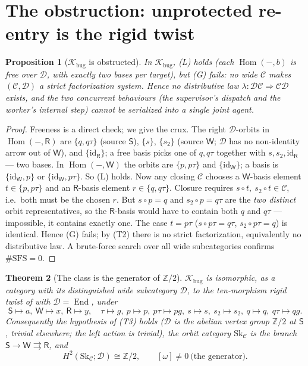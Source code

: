 \documentclass[11pt]{article}
\newtheorem{theorem}{Theorem}
\newtheorem{proposition}[theorem]{Proposition}
\theoremstyle{definition}
\newcommand{\Hom}{\operatorname{Hom}}
\newcommand{\End}{\operatorname{End}}
\newcommand{\id}{\mathrm{id}}
\newcommand{\C}{\mathcal{C}}
\newcommand{\D}{\mathcal{D}}
\newcommand{\K}{\mathcal{K}}
\newcommand{\Sk}{\mathrm{Sk}}
\newcommand{\Sup}{\mathsf{S}}
\newcommand{\Wk}{\mathsf{W}}
\newcommand{\Rt}{\mathsf{R}}
\begin{document}
\section{The obstruction: unprotected re-entry is the rigid twist}\label{sec:bug}

\begin{proposition}[$\K_{\mathrm{bug}}$ is obstructed]\label{prop:bug}
In $\K_{\mathrm{bug}}$, \textnormal{(L)} holds (each $\Hom(-,b)$ is free over $\D$,
with exactly two bases per target), but \textnormal{(G)} fails: no wide $\C$ makes
$(\C,\D)$ a strict factorization system. Hence no distributive law
$\lambda:\D\C\Rightarrow\C\D$ exists, and the two concurrent behaviours (the
supervisor's dispatch and the worker's internal step) cannot be serialized into a
single joint agent.
\end{proposition}

\begin{proof}
Freeness is a direct check; we give the crux. The right $\D$-orbits in $\Hom(-,\Rt)$
are $\{q,q\tau\}$ (source $\Sup$), $\{s\}$, $\{s_2\}$ (source $\Wk$; $\D$ has no
non-identity arrow out of $\Wk$), and $\{\id_\Rt\}$; a free basis picks one of
$q,q\tau$ together with $s,s_2,\id_\Rt$ --- two bases. In $\Hom(-,\Wk)$ the orbits
are $\{p,p\tau\}$ and $\{\id_\Wk\}$; a basis is $\{\id_\Wk,p\}$ or $\{\id_\Wk,p\tau\}$.
So \textnormal{(L)} holds. Now any closing $\C$ chooses a $\Wk$-basis element
$t\in\{p,p\tau\}$ and an $\Rt$-basis element $r\in\{q,q\tau\}$. Closure requires
$s\circ t,\ s_2\circ t\in\C$, i.e.\ both must be the chosen $r$. But
$s\circ p=q$ and $s_2\circ p=q\tau$ are the \emph{two distinct} orbit representatives,
so the $\Rt$-basis would have to contain both $q$ and $q\tau$ --- impossible, it
contains exactly one. The case $t=p\tau$ ($s\circ p\tau=q\tau$, $s_2\circ p\tau=q$)
is identical. Hence \textnormal{(G)} fails; by (T2) there is no strict factorization,
equivalently no distributive law. A brute-force search over all wide subcategories
confirms $\#\mathrm{SFS}=0$.
\end{proof}

\begin{theorem}[The class is the generator of $\mathbb Z/2$]\label{thm:h2}
$\K_{\mathrm{bug}}$ is isomorphic, as a category with its distinguished wide
subcategory $\D$, to the ten-morphism rigid twist of \cite{gobstr} with
$\D=\End$, under
\[
  \Sup\mapsto a,\ \Wk\mapsto x,\ \Rt\mapsto y,\quad
  \tau\mapsto g,\ p\mapsto p,\ p\tau\mapsto pg,\ s\mapsto s,\ s_2\mapsto s_2,\
  q\mapsto q,\ q\tau\mapsto qg.
\]
Consequently the hypothesis of (T3) holds ($\D$ is the abelian vertex group
$\mathbb Z/2$ at $\Sup$, trivial elsewhere; the left action is trivial), the orbit
category $\Sk_\C$ is the branch $\Sup\to\Wk\rightrightarrows\Rt$, and
\[
  H^2(\Sk_\C;\D)\cong\mathbb Z/2,\qquad [\omega]\neq 0\ \text{(the generator).}
\]
\end{theorem}
\end{document}
